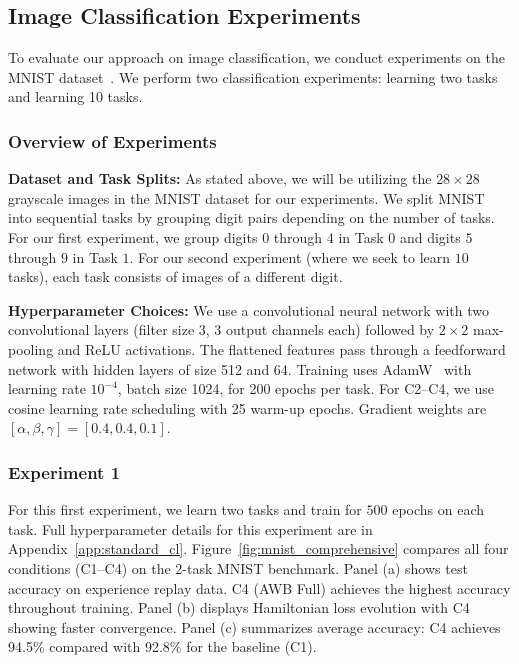 \subsection{Image Classification Experiments}
To evaluate our approach on image classification, we conduct experiments on the MNIST dataset~\cite{lecun1998mnist}. We perform two classification experiments: learning two tasks and learning 10 tasks.

\subsubsection{Overview of Experiments}

\textbf{Dataset and Task Splits:} As stated above, we will be utilizing the $28 \times 28$ grayscale images in the MNIST dataset for our experiments. We split MNIST into sequential tasks by grouping digit pairs depending on the number of tasks. For our first experiment, we group digits $0$ through $4$ in Task $0$ and digits $5$ through $9$ in Task $1.$ For our second experiment (where we seek to learn $10$ tasks), each task consists of images of a different digit.

\textbf{Hyperparameter Choices:} We use a convolutional neural network with two convolutional layers (filter size 3, 3 output channels each) followed by $2 \times 2$ max-pooling and ReLU activations. The flattened features pass through a feedforward network with hidden layers of size 512 and 64. Training uses AdamW~\cite{loshchilov2017fixing} with learning rate $10^{-4}$, batch size 1024, for 200 epochs per task. For C2--C4, we use cosine learning rate scheduling with 25 warm-up epochs. Gradient weights are $[\alpha, \beta, \gamma] = [0.4, 0.4, 0.1]$.


\subsubsection{Experiment 1}

For this first experiment, we learn two tasks and train for $500$ epochs on each task. Full hyperparameter details for this experiment are in Appendix~\ref{app:standard_cl}. Figure~\ref{fig:mnist_comprehensive} compares all four conditions (C1--C4) on the 2-task MNIST benchmark. Panel (a) shows test accuracy on experience replay data. C4 (AWB Full) achieves the highest accuracy throughout training. Panel (b) displays Hamiltonian loss evolution with C4 showing faster convergence. Panel (c) summarizes average accuracy: C4 achieves 94.5\% compared with 92.8\% for the baseline (C1).


